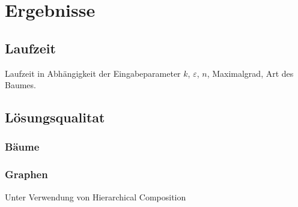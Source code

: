 
\chapter{Ergebnisse}\label{chapter:ergebnisse}
\section{Laufzeit}
    Laufzeit in Abhängigkeit der Eingabeparameter $k$, $\varepsilon$, $n$, Maximalgrad, Art des Baumes.
\section{Lösungsqualitat}
\subsection{Bäume}
\subsection{Graphen}
Unter Verwendung von Hierarchical Composition

